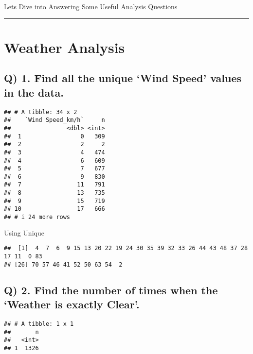 \documentclass[
]{article}
\begin{document}
Lets Dive into Answering Some Useful Analysis Questions

\begin{center}\rule{0.5\linewidth}{0.5pt}\end{center}

\hypertarget{weather-analysis}{%
\section{Weather Analysis}\label{weather-analysis}}

\hypertarget{q-1.-find-all-the-unique-wind-speed-values-in-the-data.}{%
\subsection{Q) 1. Find all the unique `Wind Speed' values in the
data.}\label{q-1.-find-all-the-unique-wind-speed-values-in-the-data.}}

\begin{verbatim}
## # A tibble: 34 x 2
##    `Wind Speed_km/h`     n
##                <dbl> <int>
##  1                 0   309
##  2                 2     2
##  3                 4   474
##  4                 6   609
##  5                 7   677
##  6                 9   830
##  7                11   791
##  8                13   735
##  9                15   719
## 10                17   666
## # i 24 more rows
\end{verbatim}

Using Unique

\begin{verbatim}
##  [1]  4  7  6  9 15 13 20 22 19 24 30 35 39 32 33 26 44 43 48 37 28 17 11  0 83
## [26] 70 57 46 41 52 50 63 54  2
\end{verbatim}

\hypertarget{q-2.-find-the-number-of-times-when-the-weather-is-exactly-clear.}{%
\subsection{Q) 2. Find the number of times when the `Weather is exactly
Clear'.}\label{q-2.-find-the-number-of-times-when-the-weather-is-exactly-clear.}}

\begin{verbatim}
## # A tibble: 1 x 1
##       n
##   <int>
## 1  1326
\end{verbatim}
\end{document}
